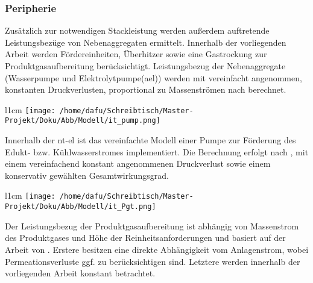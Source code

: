 \documentclass[onecolumn,10pt,titlepage]{article}
\begin{document}
\subsubsection{Peripherie}
\label{subsubs_mod_Periph}
Zusätzlich zur notwendigen Stackleistung werden außerdem auftretende Leistungsbezüge von Nebenaggregaten ermittelt. Innerhalb der vorliegenden Arbeit werden Fördereinheiten, Überhitzer sowie eine Gastrockung zur Produktgasaufbereitung berücksichtigt.
Leistungsbezug der Nebenaggregate (Wasserpumpe und Elektrolytpumpe(\gls{ael})) werden mit vereinfacht angenommen, konstanten Druckverlusten, proportional zu Massenströmen nach \cite{KSB2005} berechnet.
\newline


\begin{wrapfigure}{l}{1cm}
	\texttt{[image: /home/dafu/Schreibtisch/Master-Projekt/Doku/Abb/Modell/it\_pump.png]}
\end{wrapfigure}
Innerhalb der \gls{nt}-\gls{el} ist das vereinfachte Modell einer Pumpe zur Förderung des Edukt- bzw. Kühlwasserstromes implementiert. Die Berechnung erfolgt nach \cite{KSB2005} %
, mit einem vereinfachend konstant angenommenen Druckverlust sowie einem konservativ gewählten Gesamtwirkungsgrad.
\newline


\begin{wrapfigure}{l}{1cm}
	\texttt{[image: /home/dafu/Schreibtisch/Master-Projekt/Doku/Abb/Modell/it\_Pgt.png]}
\end{wrapfigure} Der Leistungsbezug der Produktgasaufbereitung ist abhängig von Massenstrom des Produktgases und Höhe der Reinheitsanforderungen und basiert auf der Arbeit von \cite{Tjarks2017}. Erstere besitzen eine direkte Abhängigkeit vom Anlagenstrom, wobei Permeationsverluste ggf. zu berücksichtigen sind. Letztere werden innerhalb der vorliegenden Arbeit konstant betrachtet. %
\newline

\end{document}
